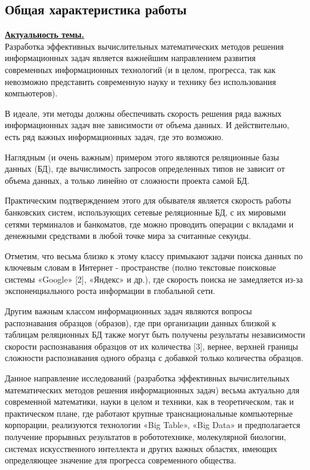 \subsection*{\Large Общая характеристика работы}
\fontsize{14pt}{15pt}\selectfont
\noindent
\underline{\textbf{Актуальность темы.}}\\
Разработка эффективных вычислительных математических методов решения информационных задач является важнейшим направлением развития современных информационных технологий (и в целом, прогресса, так как невозможно представить современную науку и технику  без использования компьютеров). 

В идеале, эти методы должны обеспечивать скорость решения ряда важных информационных задач вне зависимости от объема данных. И действительно, есть ряд важных  информационных задач, где это возможно. 

Наглядным (и очень важным) примером  этого являются реляционные базы данных (БД), где вычислимость запросов определенных типов не зависит от объема данных, а только линейно от сложности проекта самой БД.

Практическим подтверждением этого для обывателя является скорость работы банковских систем, использующих сетевые реляционные БД,  с их мировыми сетями терминалов и банкоматов, где можно проводить операции с вкладами и денежными средствами в любой точке мира за считанные секунды.

Отметим, что весьма близко к этому классу  примыкают задачи поиска данных по ключевым словам в Интернет - пространстве (полно текстовые поисковые системы «Google» [2], «Яндекс» и др.), где скорость поиска не замедляется из-за экспоненциального роста информации в глобальной сети.

Другим  важным классом информационных задач являются вопросы распознавания  образцов (образов), где при организации данных близкой к таблицам реляционных БД также могут быть получены результаты независимости скорости  распознавания  образцов от их количества [3], вернее, верхней границы сложности распознавания одного образца с добавкой только количества образцов. 

Данное направление исследований (разработка эффективных вычислительных математических методов решения информационных задач) весьма актуально для современной математики, науки в целом и техники, как в теоретическом, так и  практическом плане, где работают крупные транснациональные компьютерные корпорации, реализуются технологии «Big Table»,  «Big Data» и предполагается получение прорывных результатов в робототехнике, молекулярной биологии, системах искусственного интеллекта и других важных областях, имеющих определяющее значение для прогресса современного общества.


